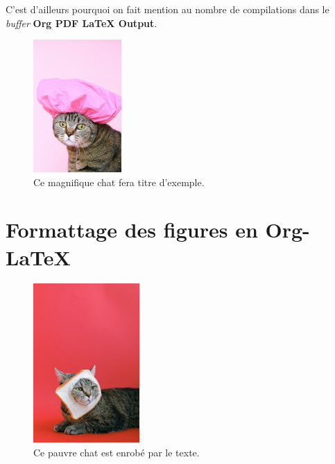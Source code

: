 \documentclass[8pt]{article}
\numberwithin{equation}{section}
\begin{document}
C'est d'ailleurs pourquoi on fait mention au nombre de compilations dans le \emph{buffer} \textbf{Org PDF \LaTeX{} Output}.

\begin{figure}[htbp]
\centering
\includegraphics[width=0.3\textwidth]{figures/pexels-photo-4587959.jpeg}
\caption{\label{fig:org6f5f22f}Ce magnifique chat fera titre d'exemple.}
\end{figure}

\newpage

\section{Formattage des figures en Org-\LaTeX{}}
\label{sec:org7a18586}

\begin{figure} \vspace{-\baselineskip}
\centering
\includegraphics[width=0.36\textwidth]{figures/pexels-photo-4587955.jpeg}
\caption{\label{fig:orgbe65fbd}Ce pauvre chat est enrobé par le texte.}
\end{figure}
\end{document}

